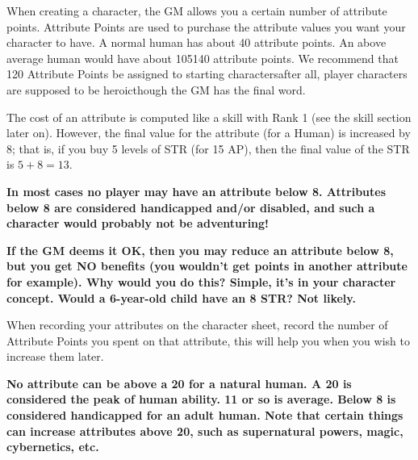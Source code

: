\documentclass[twoside]{book}
\begin{document}
    {  
    When creating a character, the GM allows you a
               certain number of attribute points. Attribute Points are
               used to purchase the attribute values you want your
               character to have. A normal human has about 40 attribute
               points. An above average human would have about
               105140 attribute points. We recommend that 120
               Attribute Points be assigned to starting
               charactersafter all, player characters are supposed
               to be heroicthough the GM has the final word.
               
    }
  
    {  
    The cost of an attribute is computed like a skill
              with Rank 1 (see the skill section later on). However, the
              final value for the attribute (for a Human) is increased by
              8; that is, if you buy 5 levels of STR (for 15 AP), then
              the final value of the STR is \begin{math} 5  +
               8  =    13 \end{math}.
            
    }
  

 \textbf{ In most cases no player may have an attribute below
               8. Attributes below 8 are considered handicapped and/or
               disabled, and such a character would probably not be
               adventuring! }



 \textbf{ If the GM deems it OK, then you may reduce an
               attribute below 8, but you get NO benefits (you
               wouldn't get points in another attribute for
               example). Why would you do this? Simple, it's in
               your character concept. Would a 6-year-old child have an 8
               STR? Not likely. }


    {  
    When recording your attributes on the character
               sheet, record the number of Attribute Points you spent on
               that attribute, this will help you when you wish to
               increase them later. 
    }
  

 \textbf{ No attribute can be above a 20 for a natural human.
               A 20 is considered the peak of human ability. 11 or so is
               average. Below 8 is considered handicapped for an adult
               human. Note that certain things can increase attributes
               above 20, such as supernatural powers, magic, cybernetics,
               etc. }
\end{document}
